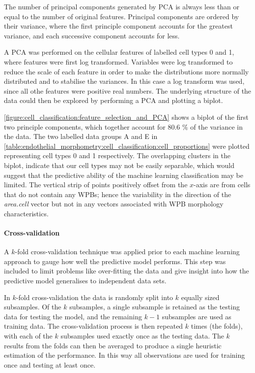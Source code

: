 The number of principal components generated by PCA is always less than or equal to the number of original features. Principal components are ordered by their variance, where the first principle component accounts for the greatest variance, and each successive component accounts for less.

A PCA was performed on the cellular features of labelled cell types 0 and 1, where features were first log transformed. Variables were log transformed to reduce the scale of each feature in order to make the distributions more normally distributed and to stabilise the variances. In this case a log transform was used, since all othe features were positive real numbers. The underlying structure of the data could then be explored by performing a PCA and plotting a biplot.

\autoref{figure:cell_classification:feature_selection_and_PCA} shows a biplot of the first two principle components, which together account for 80.6 $\%$ of the variance in the data. The two labelled data groups A and E in \autoref{table:endothelial_morphometry:cell_classification:cell_proportions} were plotted representing cell types 0 and 1 respectively. The overlapping clusters in the biplot, indicate that our cell types may not be easily separable, which would suggest that the predictive ability of the  machine learning classification may be limited. The vertical strip of points positively offset from the $x$-axis are from cells that do not contain any WPBs; hence the variability in the direction of the \emph{area.cell} vector but not in any vectors associated with WPB morphology characteristics.

\paragraph{Cross-validation}
A $k$-fold cross-validation technique was applied prior to each machine learning approach to gauge how well the predictive model performs. This step was included to limit problems like over-fitting the data and give insight into how the predictive model generalises to independent data sets.

In $k$-fold cross-validation the data is randomly split into $k$ equally sized subsamples. Of the $k$ subsamples, a single subsample is retained as the testing data for testing the model, and the remaining $k - 1$ subsamples are used as training data. The cross-validation process is then repeated $k$ times (the folds), with each of the $k$ subsamples used exactly once as the testing data. The $k$ results from the folds can then be averaged to produce a single heuristic estimation of the performance. In this way all observations are used for training once and testing at least once.


